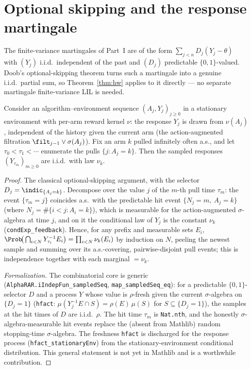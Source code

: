 \section{Optional skipping and the response martingale}
\label{sec:llil_skip}

The finite-variance martingales of Part~I are of the form
$\sum_{j<n}D_j(Y_j-\theta)$ with $(Y_j)$ i.i.d.\ independent of the past and $(D_j)$
predictable $\{0,1\}$-valued. Doob's optional-skipping theorem turns such a martingale
into a genuine i.i.d.\ partial sum, so Theorem~\ref{thm:hw} applies to it directly ---
no separate martingale finite-variance LIL is needed.

\begin{lemma}\label{lem:opt_skip}
\leanok
Consider an algorithm--environment sequence $(A_j,Y_j)_{j\ge0}$ in a stationary environment with
per-arm reward kernel $\nu$: the response $Y_j$ is drawn from $\nu(A_j)$, independent of the history
given the current arm (the action-augmented filtration $\filt_{j-1}\vee\sigma(A_j)$). Fix an arm $k$
pulled infinitely often a.s., and let $\tau_0<\tau_1<\cdots$ enumerate the pulls $\{j:A_j=k\}$. Then
the sampled responses $(Y_{\tau_m})_{m\ge0}$ are i.i.d.\ with law $\nu_k$.
\end{lemma}
\begin{proof}\leanok
The classical optional-skipping argument, with the selector $D_j=\indic_{\{A_j=k\}}$. Decompose over
the value $j$ of the $m$-th pull time $\tau_m$: the event $\{\tau_m=j\}$ coincides a.s.\ with the
predictable hit event $\{N_j=m,\ A_j=k\}$ (where $N_j=\#\{i<j:A_i=k\}$), which is measurable for the
action-augmented $\sigma$-algebra at time $j$, and on it the conditional law of $Y_j$ is the constant
$\nu_k$ (\texttt{condExp\_feedback}). Hence, for any prefix and measurable sets $E_i$,
$\Prob\!\big(\bigcap_{i<N}Y_{\tau_i}^{-1}E_i\big)=\prod_{i<N}\nu_k(E_i)$ by induction on $N$, peeling
the newest sample and summing over its a.s.-covering, pairwise-disjoint pull events; this is
independence together with each marginal $=\nu_k$.

\emph{Formalization.} The combinatorial core is generic (\texttt{AlphaRAR.iIndepFun\_sampledSeq},
\texttt{map\_sampledSeq\_eq}): for a predictable $\{0,1\}$-selector $D$ and a process $Y$ whose value
is $\rho$-fresh given the current $\sigma$-algebra on $\{D_j=1\}$
(\texttt{hfact}: $\mu(Y_j^{-1}E\cap S)=\rho(E)\,\mu(S)$ for $S\subseteq\{D_j=1\}$), the samples at the
hit times of $D$ are i.i.d.\ $\rho$. The hit time $\tau_m$ is \texttt{Nat.nth}, and the honestly
$\sigma$-algebra-measurable hit events replace the (absent from Mathlib) random stopping-time
$\sigma$-algebra. The freshness \texttt{hfact} is discharged for the response process
(\texttt{hfact\_stationaryEnv}) from the stationary-environment conditional distribution. This
general statement is not yet in Mathlib and is a worthwhile contribution.
\end{proof}

